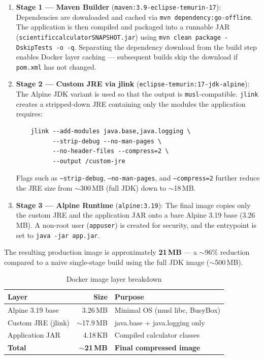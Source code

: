 \documentclass[12pt]{article}
\begin{document}
\begin{enumerate}
    \item \begin{sloppypar}\textbf{Stage 1 --- Maven Builder} (\texttt{maven:3.9-eclipse-temurin-17}): Dependencies are downloaded and cached via \texttt{mvn dependency:go-offline}. The application is then compiled and packaged into a runnable JAR (\texttt{scientific\-calculator\-SNAPSHOT.jar}) using \texttt{mvn clean package -DskipTests -o -q}. Separating the dependency download from the build step enables Docker layer caching --- subsequent builds skip the download if \texttt{pom.xml} has not changed.\end{sloppypar}

    \item \begin{sloppypar}\textbf{Stage 2 --- Custom JRE via jlink} (\texttt{eclipse-temurin:17-jdk-alpine}): The Alpine JDK variant is used so that the output is \texttt{musl}-compatible. \texttt{jlink} creates a stripped-down JRE containing only the modules the application requires:\end{sloppypar}
    \begin{verbatim}
    jlink --add-modules java.base,java.logging \
          --strip-debug --no-man-pages \
          --no-header-files --compress=2 \
          --output /custom-jre
    \end{verbatim}
    Flags such as \texttt{--strip-debug}, \texttt{--no-man-pages}, and \texttt{--compress=2} further reduce the JRE size from $\sim$300\,MB (full JDK) down to $\sim$18\,MB.

    \item \textbf{Stage 3 --- Alpine Runtime} (\texttt{alpine:3.19}): The final image copies only the custom JRE and the application JAR onto a bare Alpine 3.19 base (3.26\,MB). A non-root user (\texttt{appuser}) is created for security, and the entrypoint is set to \texttt{java -jar app.jar}.
\end{enumerate}

\noindent The resulting production image is approximately \textbf{21\,MB} --- a $\sim$96\% reduction compared to a naive single-stage build using the full JDK image ($\sim$500\,MB).

\begin{table}[H]
\centering
\begin{tabular}{|l|r|l|}
\hline
\textbf{Layer} & \textbf{Size} & \textbf{Purpose} \\
\hline
Alpine 3.19 base  & 3.26\,MB  & Minimal OS (musl libc, BusyBox) \\
\hline
Custom JRE (jlink) & $\sim$17.9\,MB & java.base + java.logging only \\
\hline
Application JAR    & 4.18\,KB  & Compiled calculator classes \\
\hline
\textbf{Total}     & \textbf{$\sim$21\,MB} & \textbf{Final compressed image} \\
\hline
\end{tabular}
\caption{Docker image layer breakdown}
\end{table}
\end{document}
